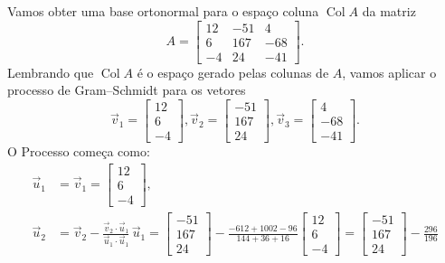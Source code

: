 \documentclass[../livro.tex]{subfiles}  %
\begin{document}
\begin{example}
Vamos obter uma base ortonormal para o espaço coluna $\operatorname{Col} A$ da matriz
\begin{equation}
A =
\begin{bmatrix}
12 & -51 & 4 \\
6 & 167 & -68 \\
-4 & 24 & -41
\end{bmatrix}.
\end{equation} Lembrando que $\operatorname{Col} A$ é o espaço gerado pelas colunas de $A$, vamos aplicar o processo de Gram--Schmidt para os vetores
\begin{equation}
\vec{v}_1 =
\begin{bmatrix}
12 \\
6 \\
-4
\end{bmatrix},
\vec{v}_2 =
\begin{bmatrix}
 -51  \\
 167  \\
 24
\end{bmatrix}, \vec{v}_3 =
\begin{bmatrix}
  4 \\
 -68 \\
 -41
\end{bmatrix}.
\end{equation} O Processo começa como:
\begin{equation}
\begin{split}
\vec{u}_1 & = \vec{v}_1 =
\begin{bmatrix}
12 \\
6 \\
-4
\end{bmatrix}, \\
\vec{u}_2 &  = \vec{v}_2 - \frac{\vec{v}_2 \cdot \vec{u}_1}{\vec{u}_1 \cdot \vec{u}_1} \, \vec{u}_1 =
\begin{bmatrix}
 -51  \\
 167  \\
 24
\end{bmatrix} - \frac{-612 +1002 - 96}{144 + 36 + 16}
\begin{bmatrix}
12 \\
6 \\
-4
\end{bmatrix} =
\begin{bmatrix}
 -51  \\
 167  \\
 24
\end{bmatrix} - \frac{296}{196}

\end{split}
\end{equation}
\end{example}
\end{document}
